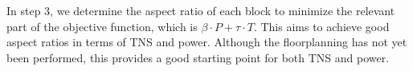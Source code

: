 
In step 3, we determine the aspect ratio of each block to minimize the relevant part of the objective function, which is $\beta \cdot P + \tau \cdot T$. This aims to achieve good aspect ratios in terms of TNS and power. Although the floorplanning has not yet been performed, this provides a good starting point for both TNS and power.

